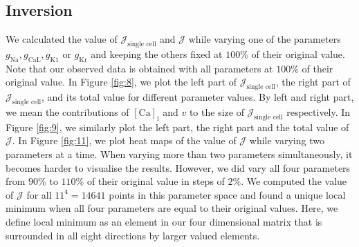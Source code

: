 \documentclass{article}
\begin{document}
\subsection{Inversion} \label{Inversion}
We calculated the value of $\mathcal{J}_{\text{single cell}}$ and $\mathcal{J}$ while varying one of the parameters $g_{\mathrm{Na}}, g_{\mathrm{CaL}}, g_{\mathrm{K1}}$ or $g_{\mathrm{Kr}}$ and keeping the others fixed at $100\%$ of their original value. Note that our observed data is obtained with all parameters at $100\%$ of their original value. In Figure \ref{fig:8}, we plot the left part of $\mathcal{J}_{\text{single cell}}$, the right part of $\mathcal{J}_{\text{single cell}}$, and its total value for different parameter values. By left and right part, we mean the contributions of $[\mathrm{Ca}]_{\mathrm{i}}$ and $v$ to the size of $\mathcal{J}_{\text{single cell}}$ respectively. In Figure \ref{fig:9}, we similarly plot the left part, the right part and the total value of $\mathcal{J}$. In Figure \ref{fig:11}, we plot heat maps of the value of $\mathcal{J}$ while varying two parameters at a time. When varying more than two parameters simultaneously, it becomes harder to visualise the results. However, we did vary all four parameters from $90\%$ to $110\%$ of their original value in steps of $2\%$. We computed the value of $\mathcal{J}$ for all $11^4=14641$ points in this parameter space and found a unique local minimum when all four parameters are equal to their original values. Here, we define local minimum as an element in our four dimensional matrix that is surrounded in all eight directions by larger valued elements.
\end{document}
